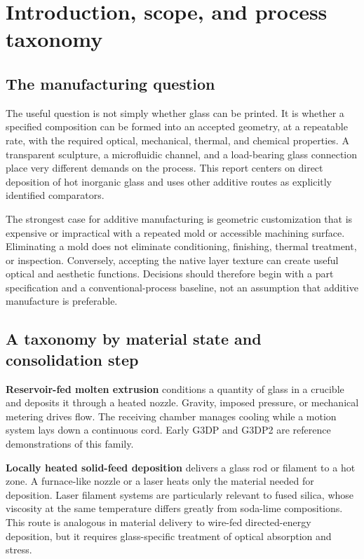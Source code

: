 \section{Introduction, scope, and process taxonomy}
\label{sec:introduction}
\subsection{The manufacturing question}
The useful question is not simply whether glass can be printed. It is whether a specified composition can be formed into an accepted geometry, at a repeatable rate, with the required optical, mechanical, thermal, and chemical properties. A transparent sculpture, a microfluidic channel, and a load-bearing glass connection place very different demands on the process. This report centers on direct deposition of hot inorganic glass and uses other additive routes as explicitly identified comparators.

The strongest case for additive manufacturing is geometric customization that is expensive or impractical with a repeated mold or accessible machining surface. Eliminating a mold does not eliminate conditioning, finishing, thermal treatment, or inspection. Conversely, accepting the native layer texture can create useful optical and aesthetic functions. Decisions should therefore begin with a part specification and a conventional-process baseline, not an assumption that additive manufacture is preferable.

\subsection{A taxonomy by material state and consolidation step}
\textbf{Reservoir-fed molten extrusion} conditions a quantity of glass in a crucible and deposits it through a heated nozzle. Gravity, imposed pressure, or mechanical metering drives flow. The receiving chamber manages cooling while a motion system lays down a continuous cord. Early G3DP and G3DP2 are reference demonstrations of this family.\cite{acad_klein2015,acad_inamura2018}

\textbf{Locally heated solid-feed deposition} delivers a glass rod or filament to a hot zone. A furnace-like nozzle or a laser heats only the material needed for deposition. Laser filament systems are particularly relevant to fused silica, whose viscosity at the same temperature differs greatly from soda-lime compositions. This route is analogous in material delivery to wire-fed directed-energy deposition, but it requires glass-specific treatment of optical absorption and stress.\cite{acad_liu2022}

